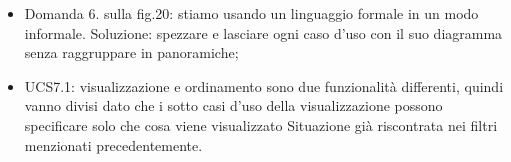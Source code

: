 \begin{itemize}
	\item Domanda 6. sulla fig.20: stiamo usando un linguaggio formale in un modo informale.
	Soluzione: spezzare e lasciare ogni caso d’uso con il suo diagramma senza raggruppare in panoramiche;
	\item UCS7.1: visualizzazione e ordinamento sono due funzionalità differenti, quindi vanno divisi dato che i sotto casi d’uso della visualizzazione possono specificare solo che cosa viene visualizzato
	Situazione già riscontrata nei filtri menzionati precedentemente.
\end{itemize}

\clearpage